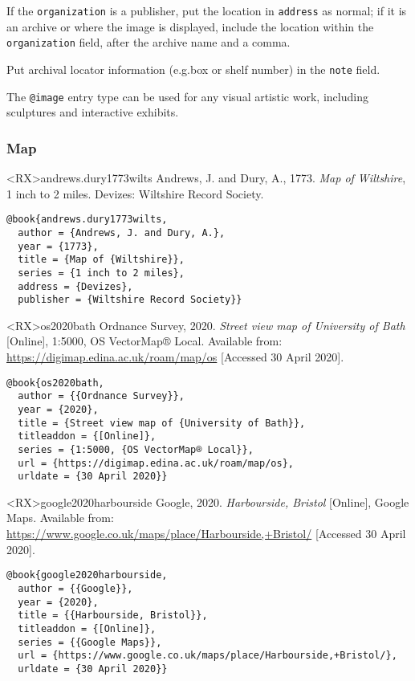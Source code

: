 \documentclass[10pt,a4paper]{article}
\newenvironment{tips}{%
  \begin{list}{\makebox[2em][c]{\faLightbulbO}}{%
    \setlength{\leftmargin}{2em}
    \setlength{\labelwidth}{2em}
    \setlength{\labelsep}{0pt}}
}{\end{list}}
\newenvironment{info}{%
  \begin{list}{\makebox[2em][c]{\faInfoCircle}}{%
    \setlength{\leftmargin}{2em}
    \setlength{\labelwidth}{2em}
    \setlength{\labelsep}{0pt}}
}{\end{list}}
\begin{document}
\begin{tips}\item
If the \texttt{organization} is a publisher, put the location in \texttt{address} as normal;
if it is an archive or where the image is displayed, include the location within the \texttt{organization} field,
after the archive name and a comma.
\item
Put archival locator information (e.g.\@ box or shelf number) in the \texttt{note} field.
\end{tips}

\begin{info}\item
The \texttt{@image} entry type can be used for any visual artistic work,
including sculptures and interactive exhibits.
\end{info}

\subsubsection*{Map}

\begin{bibexbox}<RX>{andrews.dury1773wilts}
  Andrews, J. and Dury, A., 1773. \emph{Map of Wiltshire}, 1 inch to 2 miles. Devizes: Wiltshire Record Society.
  \tcblower
\begin{Verbatim}
@book{andrews.dury1773wilts,
  author = {Andrews, J. and Dury, A.},
  year = {1773},
  title = {Map of {Wiltshire}},
  series = {1 inch to 2 miles},
  address = {Devizes},
  publisher = {Wiltshire Record Society}}
\end{Verbatim}
\end{bibexbox}

\begin{bibexbox}<RX>{os2020bath}
  Ordnance Survey, 2020. \emph{Street view map of University of Bath} [Online], 1:5000, OS VectorMap® Local. Available from: \url{https://digimap.edina.ac.uk/roam/map/os} [Accessed 30 April 2020].
  \tcblower
\begin{Verbatim}
@book{os2020bath,
  author = {{Ordnance Survey}},
  year = {2020},
  title = {Street view map of {University of Bath}},
  titleaddon = {[Online]},
  series = {1:5000, {OS VectorMap® Local}},
  url = {https://digimap.edina.ac.uk/roam/map/os},
  urldate = {30 April 2020}}
\end{Verbatim}
\end{bibexbox}

\begin{bibexbox}<RX>{google2020harbourside}
  Google, 2020. \emph{Harbourside, Bristol} [Online], Google Maps. Available from: \url{https://www.google.co.uk/maps/place/Harbourside,+Bristol/} [Accessed 30 April 2020].
  \tcblower
\begin{Verbatim}
@book{google2020harbourside,
  author = {{Google}},
  year = {2020},
  title = {{Harbourside, Bristol}},
  titleaddon = {[Online]},
  series = {{Google Maps}},
  url = {https://www.google.co.uk/maps/place/Harbourside,+Bristol/},
  urldate = {30 April 2020}}
\end{Verbatim}
\end{bibexbox}
\end{document}
